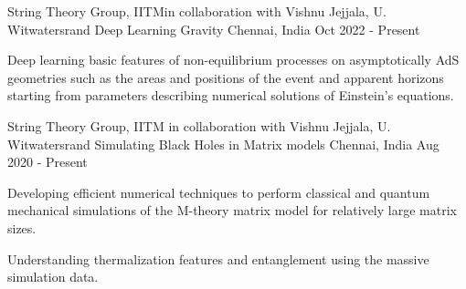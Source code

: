 

\begin{cventries}

  \cventry
    {String Theory Group, IITM\footnotemark[1] in collaboration with Vishnu Jejjala, U. Witwatersrand} %
    {Deep Learning Gravity} %
    {Chennai, India} %
    {Oct 2022 - Present} %
    {
      \begin{cvitems} %
        \item {Deep learning basic features of non-equilibrium processes on asymptotically AdS geometries such as the areas and positions of the event and apparent horizons starting from parameters describing numerical solutions of Einstein's equations.}
      \end{cvitems}
    }

  \vspace{1ex}

  \cventry
    {String Theory Group, IITM in collaboration with Vishnu Jejjala, U. Witwatersrand} %
    {Simulating Black Holes in Matrix models} %
    {Chennai, India} %
    {Aug 2020 - Present} %
    {
      \begin{cvitems} %
        \item {Developing efficient numerical techniques to perform classical and quantum mechanical simulations of the M-theory matrix model for relatively large matrix sizes.}
        \item {Understanding thermalization features and entanglement using the massive simulation data.}
      \end{cvitems}
    }
    

\end{cventries}
